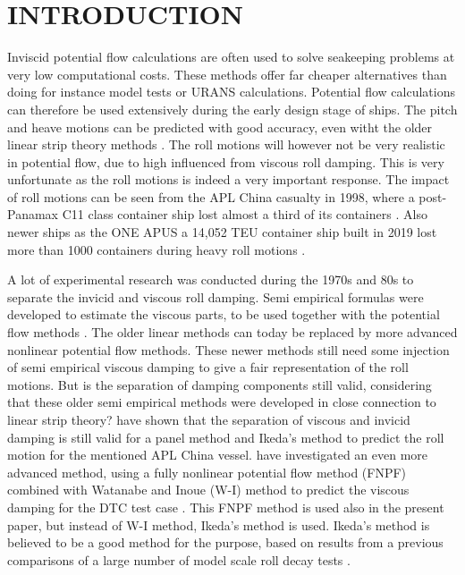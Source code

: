 \section*{INTRODUCTION}\label{introduction}
Inviscid potential flow calculations are often used to solve seakeeping
problems at very low computational costs. These methods offer far
cheaper alternatives than doing for instance model tests or URANS
calculations. Potential flow calculations can therefore be used
extensively during the early design stage of ships. The pitch and heave
motions can be predicted with good accuracy, even witht the older linear
strip theory methods \citep{7505983/FB64RGPF}. The roll motions will however not be very realistic in potential flow,
due to high influenced from viscous roll damping. This is very
unfortunate as the roll motions is indeed a very important response. The
impact of roll motions can be seen from the APL China casualty in 1998,
where a post-Panamax C11 class container ship lost almost a third of its
containers \citep{7505983/WPADAQB3}. Also newer ships as the ONE APUS a
14,052 TEU container ship built in 2019 lost more than 1000 containers
during heavy roll motions \citep{7505983/EYV6YF92}.

A lot of experimental research was conducted during the 1970s and 80s to
separate the invicid and viscous roll damping. Semi empirical formulas
were developed to estimate the viscous parts, to be used together with
the potential flow methods \citep{7505983/937PN5DT}. The older linear
methods can today be replaced by more advanced nonlinear potential flow
methods. These newer methods still need some injection of semi empirical
viscous damping to give a fair representation of the roll motions. But
is the separation of damping components still valid, considering that
these older semi empirical methods were developed in close connection to
linear strip theory? \citep{7505983/UGK6YEVD} have shown that the
separation of viscous and invicid damping is still valid for a panel
method and Ikeda's method to predict the roll motion for the mentioned
APL China vessel. \citep{7505983/24TNAV5Z} have investigated an even more
advanced method, using a fully nonlinear potential flow method (FNPF)
\citep{7505983/P4XDUMMQ} combined with Watanabe and Inoue (W-I) method
\citep{7505983/ARMIRMVY} to predict the viscous damping for the DTC test
case \citep{7505983/BYNJ8CFG}. This FNPF method is used also in the
present paper, but instead of W-I method, Ikeda's method is used.
Ikeda's method is believed to be a good method for the purpose, based on
results from a previous comparisons of a large number of model scale
roll decay tests \citep{7505983/QMGQ76Q9}.

